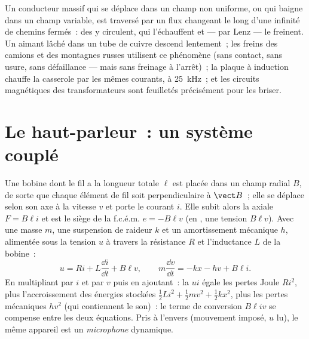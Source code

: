 \begin{example}\label{ex:b1:induction:eddy}
Un conducteur massif qui se déplace dans un champ non uniforme, ou qui baigne
dans un champ variable, est traversé par un flux changeant le long d'une
infinité de chemins fermés~: des \emph{} y circulent, qui
l'échauffent et --- par Lenz --- le freinent. Un aimant lâché dans un tube de
cuivre descend lentement~; les freins des camions et des montagnes russes
utilisent ce phénomène (sans contact, sans usure, sans défaillance --- mais
sans freinage à l'arrêt)~; la plaque à induction chauffe la casserole par les
mêmes courants, à \qty{25}{kHz}~; et les circuits magnétiques des
transformateurs sont feuilletés précisément pour les briser.
\end{example}

\section{Le haut-parleur~: un système couplé}

\begin{proposition}\label{prop:b1:induction:loudspeaker}
Une bobine dont le fil a la longueur totale $\ell$ est placée dans un champ
radial $B$, de sorte que chaque élément de fil soit perpendiculaire à $\vect B$~;
elle se déplace selon son axe à la vitesse $v$ et porte le courant $i$. Elle
subit alors la  axiale $F = B\ell i$ et est le siège de la
f.c.é.m. $e = -B\ell v$ (en , une tension $B\ell v$). Avec
une masse $m$, une suspension de raideur $k$ et un amortissement mécanique $h$,
alimentée sous la tension $u$ à travers la résistance $R$ et l'inductance $L$
de la bobine~:
\[
u = Ri + L\frac{\dd i}{\dd t} + B\ell v , \qquad
m\frac{\dd v}{\dd t} = -kx - hv + B\ell i .
\]
En multipliant par $i$ et par $v$ puis en ajoutant~: la  $ui$
égale les pertes Joule $Ri^2$, plus l'accroissement des énergies stockées
$\tfrac12Li^2 + \tfrac12mv^2 + \tfrac12kx^2$, plus les pertes mécaniques
$hv^2$ (qui contiennent le son)~: le terme de conversion $B\ell iv$ se compense
entre les deux équations. Pris à l'envers (mouvement imposé, $u$ lu), le même
appareil est un \emph{microphone} dynamique.
\end{proposition}

